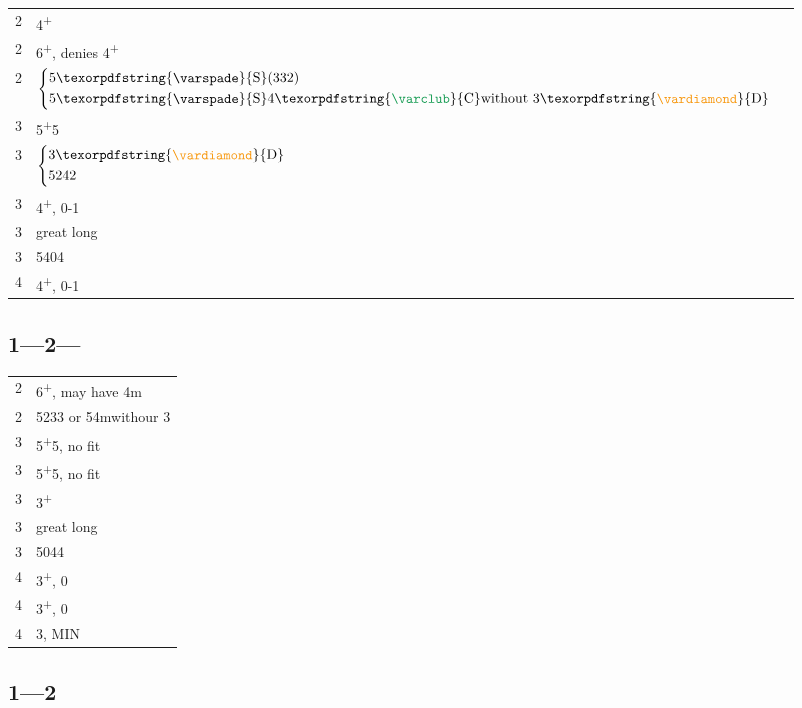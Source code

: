 \documentclass[11pt]{article}
\renewcommand{\C}{\texorpdfstring{\textcolor{ForestGreen}{\raisebox{-0.017em}{\ensuremath{\varclub}}}}{C}}
\newcommand{\D}{\texorpdfstring{\textcolor{YellowOrange}{\raisebox{-0.35pt}{\ensuremath{\vardiamond}}}}{D}}
\renewcommand{\H}{\texorpdfstring{\textcolor{Red}{\raisebox{-0.06em}{\ensuremath{\varheart}}}}{H}}
\renewcommand{\S}{\texorpdfstring{\raisebox{-0.03em}{\ensuremath{\varspade}}}{S}}
\newcommand{\N}{\texorpdfstring{\textcolor{Cerulean}{\raisebox{0.15em}{\scalebox{0.72}{\ensuremath{\bigodot}}}}}{NT}}
\newcommand{\+}{\textsuperscript{+}}
\newcommand{\m}{m}
\newenvironment{bidtable}{%
	\begin{tabular}{l l}%
}{%
	\end{tabular}%
}
\begin{document}
\begin{bidtable}
    2\H & 4\+\H \\
    2\S & 6\+\S, denies 4\+\H \\
    2\N & $\begin{dcases}
        \text{5\S(332) } & \\
        \text{5\S 4\C without 3\D} & \\
    \end{dcases}$\\
    3\C & 5\+\S 5\C \\
    3\D & $\begin{dcases}
        \text{3\D} & \\
        \text{5242} & \\
    \end{dcases}$\\
    3\H & 4\+\D, 0-1\H \\
    3\S & great long \S \\
    3\N & 5404 \\
    4\C & 4\+\D, 0-1\C \\
\end{bidtable}

\subsection{1\S---2\H---} \label{1S2H}

\begin{bidtable}
    2\S & 6\+\S, may have 4\m \\
    2\N & 5233 or 5\S 4\m withour 3\H \\
    3\C & 5\+\S 5\C, no \H fit \\
    3\D & 5\+\S 5\H, no \H fit \\
    3\H & 3\+\H \\
    3\S & great long \S \\
    3\N & 5044 \\
    4\C & 3\+\H, 0\C \\
    4\D & 3\+\H, 0\D \\
    4\H & 3\H, MIN \\
\end{bidtable}

\subsection[1\S--2\protect\N]{1\S---2\protect\N} \label{1S2N}
\end{document}
